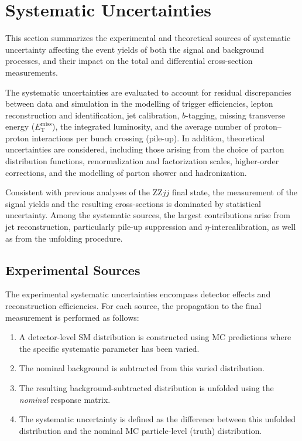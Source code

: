 \section{Systematic Uncertainties}
\label{sec:llvv_systematics}

This section summarizes the experimental and theoretical sources of systematic uncertainty affecting the event yields of both the signal and background processes, and their impact on the total and differential cross-section measurements.

The systematic uncertainties are evaluated to account for residual discrepancies between data and simulation in the modelling of trigger efficiencies, lepton reconstruction and identification, jet calibration, $b$-tagging, missing transverse energy ($E_{\text{T}}^{\text{miss}}$), the integrated luminosity, and the average number of proton--proton interactions per bunch crossing (pile-up). In addition, theoretical uncertainties are considered, including those arising from the choice of parton distribution functions, renormalization and factorization scales, higher-order corrections, and the modelling of parton shower and hadronization.

Consistent with previous analyses of the $\text{ZZ}jj$ final state, the measurement of the signal yields and the resulting cross-sections is dominated by statistical uncertainty. Among the systematic sources, the largest contributions arise from jet reconstruction, particularly pile-up suppression and $\eta$-intercalibration, as well as from the unfolding procedure.

\subsection{Experimental Sources}
\label{subsec:exp_syst}

The experimental systematic uncertainties encompass detector effects and reconstruction efficiencies. For each source, the propagation to the final measurement is performed as follows:
\begin{enumerate}
    \item A detector-level SM distribution is constructed using MC predictions where the specific systematic parameter has been varied.
    \item The nominal background is subtracted from this varied distribution.
    \item The resulting background-subtracted distribution is unfolded using the \textit{nominal} response matrix.
    \item The systematic uncertainty is defined as the difference between this unfolded distribution and the nominal MC particle-level (truth) distribution.
\end{enumerate}

